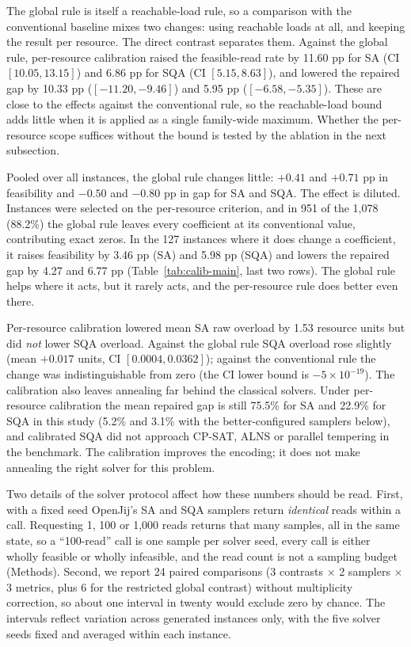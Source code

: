 \documentclass[pdflatex,sn-nature]{sn-jnl}
\theoremstyle{plain}
\theoremstyle{remark}
\begin{document}
The global rule is itself a reachable-load rule, so a comparison with the conventional baseline mixes two changes: using reachable loads at all, and keeping the result per resource. The direct contrast separates them. Against the global rule, per-resource calibration raised the feasible-read rate by 11.60 pp for SA (CI $[10.05,13.15]$) and 6.86 pp for SQA (CI $[5.15,8.63]$), and lowered the repaired gap by 10.33 pp ($[-11.20,-9.46]$) and 5.95 pp ($[-6.58,-5.35]$). These are close to the effects against the conventional rule, so the reachable-load bound adds little when it is applied as a single family-wide maximum. Whether the per-resource scope suffices without the bound is tested by the ablation in the next subsection.

Pooled over all instances, the global rule changes little: $+0.41$ and $+0.71$ pp in feasibility and $-0.50$ and $-0.80$ pp in gap for SA and SQA. The effect is diluted. Instances were selected on the per-resource criterion, and in 951 of the 1,078 (88.2\%) the global rule leaves every coefficient at its conventional value, contributing exact zeros. In the 127 instances where it does change a coefficient, it raises feasibility by 3.46 pp (SA) and 5.98 pp (SQA) and lowers the repaired gap by 4.27 and 6.77 pp (Table~\ref{tab:calib-main}, last two rows). The global rule helps where it acts, but it rarely acts, and the per-resource rule does better even there.

Per-resource calibration lowered mean SA raw overload by 1.53 resource units but did \emph{not} lower SQA overload. Against the global rule SQA overload rose slightly (mean $+0.017$ units, CI $[0.0004,0.0362]$); against the conventional rule the change was indistinguishable from zero (the CI lower bound is $-5\times10^{-19}$). The calibration also leaves annealing far behind the classical solvers. Under per-resource calibration the mean repaired gap is still 75.5\% for SA and 22.9\% for SQA in this study (5.2\% and 3.1\% with the better-configured samplers below), and calibrated SQA did not approach CP-SAT, ALNS or parallel tempering in the benchmark. The calibration improves the encoding; it does not make annealing the right solver for this problem.

Two details of the solver protocol affect how these numbers should be read. First, with a fixed seed OpenJij's SA and SQA samplers return \emph{identical} reads within a call. Requesting 1, 100 or 1,000 reads returns that many samples, all in the same state, so a ``100-read'' call is one sample per solver seed, every call is either wholly feasible or wholly infeasible, and the read count is not a sampling budget (Methods). Second, we report 24 paired comparisons (3 contrasts $\times$ 2 samplers $\times$ 3 metrics, plus 6 for the restricted global contrast) without multiplicity correction, so about one interval in twenty would exclude zero by chance. The intervals reflect variation across generated instances only, with the five solver seeds fixed and averaged within each instance.
\end{document}
